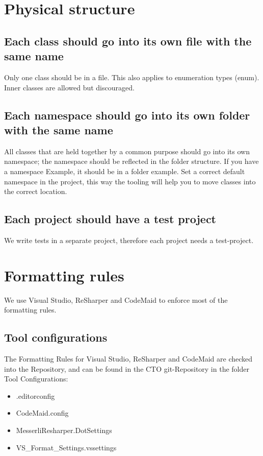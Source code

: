 \documentclass[11pt,a4paper]{article}
\begin{document}
\section{Physical structure}

\subsection{Each class should go into its own file with the same name}

Only one class should be in a file. This also applies to enumeration types (enum).
Inner classes are allowed but discouraged. 

\subsection{Each namespace should go into its own folder with the same name}

All classes that are held together by a common purpose should go into its own namespace; the namespace should be reflected in the folder structure. If you have a namespace Example, it should be in a folder example.
Set a correct default namespace in the project, this way the tooling will help you to move classes into the correct location.

\subsection{Each project should have a test project}

We write tests in a separate project, therefore each project needs a test-project.

\section{Formatting rules}

We use Visual Studio, ReSharper and CodeMaid to enforce most of the formatting rules. 

\subsection{Tool configurations}
The Formatting Rules for Visual Studio, ReSharper and CodeMaid are checked into the Repository, and can be found in the CTO git-Repository in the folder Tool Configurations:
\begin{itemize}[itemsep=0pt]
  \item .editorconfig
  \item CodeMaid.config
  \item MesserliResharper.DotSettings
  \item VS\_Format\_Settings.vssettings
\end{itemize}
\end{document}
